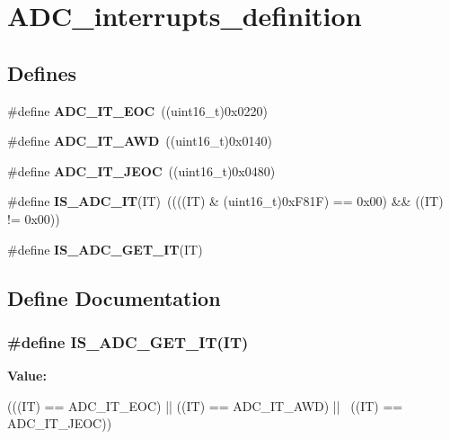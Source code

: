 \hypertarget{group__ADC__interrupts__definition}{
\section{ADC\_\-interrupts\_\-definition}
\label{group__ADC__interrupts__definition}
}
\subsection*{Defines}
\begin{DoxyCompactItemize}
\item 
\hypertarget{group__ADC__interrupts__definition_ga0ad335d835f54415194d448019569e00}{
\#define {\bfseries ADC\_\-IT\_\-EOC}~((uint16\_\-t)0x0220)}
\label{group__ADC__interrupts__definition_ga0ad335d835f54415194d448019569e00}

\item 
\hypertarget{group__ADC__interrupts__definition_ga2f5c7f9900c24250a0c6ccaa7cbca946}{
\#define {\bfseries ADC\_\-IT\_\-AWD}~((uint16\_\-t)0x0140)}
\label{group__ADC__interrupts__definition_ga2f5c7f9900c24250a0c6ccaa7cbca946}

\item 
\hypertarget{group__ADC__interrupts__definition_gad439fc0cd69706704d47aeabfeddb631}{
\#define {\bfseries ADC\_\-IT\_\-JEOC}~((uint16\_\-t)0x0480)}
\label{group__ADC__interrupts__definition_gad439fc0cd69706704d47aeabfeddb631}

\item 
\hypertarget{group__ADC__interrupts__definition_gaf5f8d35930becff402eeb8220641432f}{
\#define {\bfseries IS\_\-ADC\_\-IT}(IT)~((((IT) \& (uint16\_\-t)0xF81F) == 0x00) \&\& ((IT) != 0x00))}
\label{group__ADC__interrupts__definition_gaf5f8d35930becff402eeb8220641432f}

\item 
\#define {\bfseries IS\_\-ADC\_\-GET\_\-IT}(IT)
\end{DoxyCompactItemize}


\subsection{Define Documentation}
\hypertarget{group__ADC__interrupts__definition_gacae69f04de1a0033f065864d868c006e}{
\subsubsection[{IS\_\-ADC\_\-GET\_\-IT}]{\setlength{\rightskip}{0pt plus 5cm}\#define IS\_\-ADC\_\-GET\_\-IT(IT)}}
\label{group__ADC__interrupts__definition_gacae69f04de1a0033f065864d868c006e}
{\bfseries Value:}
\begin{DoxyCode}
(((IT) == ADC_IT_EOC) || ((IT) == ADC_IT_AWD) || \
                           ((IT) == ADC_IT_JEOC))
\end{DoxyCode}
